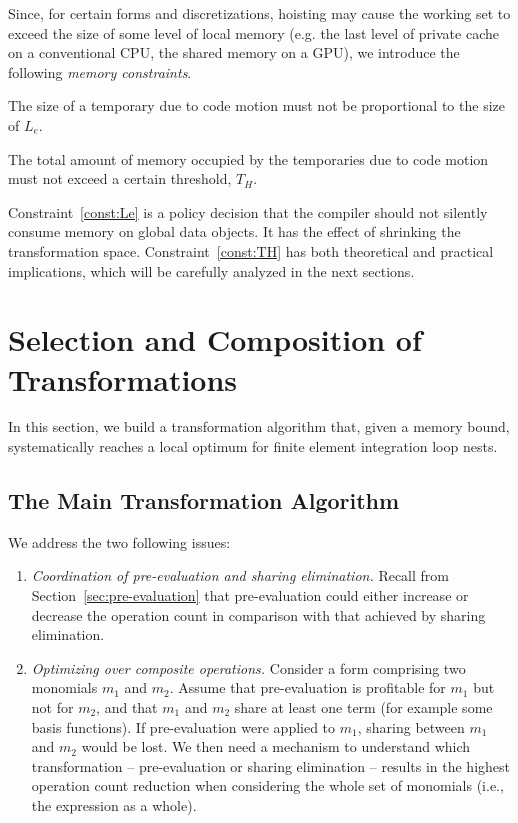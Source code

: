 Since, for certain forms and discretizations, hoisting may cause the working set to exceed the size of some level of local memory (e.g. the last level of private cache on a conventional CPU, the shared memory on a GPU), we introduce the following \textit{memory constraints}.

\begin{Const}
\label{const:Le}
The size of a temporary due to code motion must not be proportional to the size of $L_e$.
\end{Const}

\begin{Const}
\label{const:TH}
The total amount of memory occupied by the temporaries due to code motion must not exceed a certain threshold, \texttt{$T_H$}.
\end{Const}

Constraint~\ref{const:Le} is a policy decision that the compiler should not silently consume memory on global data objects. It has the effect of shrinking the transformation space. Constraint~\ref{const:TH} has both theoretical and practical implications, which will be carefully analyzed in the next sections.




\section{Selection and Composition of Transformations}
\label{sec:optimal-synthesis}
In this section, we build a transformation algorithm that, given a memory bound, systematically reaches a local optimum for finite element integration loop nests. 

\subsection{The Main Transformation Algorithm}
We address the two following issues: 
\begin{enumerate}
\item \textit{Coordination of pre-evaluation and sharing elimination.} Recall from Section~\ref{sec:pre-evaluation} that pre-evaluation could either increase or decrease the operation count in comparison with that achieved by sharing elimination.
\item \textit{Optimizing over composite operations.} Consider a form comprising two monomials $m_1$ and $m_2$. Assume that pre-evaluation is profitable for $m_1$ but not for $m_2$, and that $m_1$ and $m_2$ share at least one term (for example some basis functions). If pre-evaluation were applied to $m_1$, sharing between $m_1$ and $m_2$ would be lost. We then need a mechanism to understand which transformation -- pre-evaluation or sharing elimination -- results in the highest operation count reduction when considering the whole set of monomials (i.e., the expression as a whole).
\end{enumerate}

